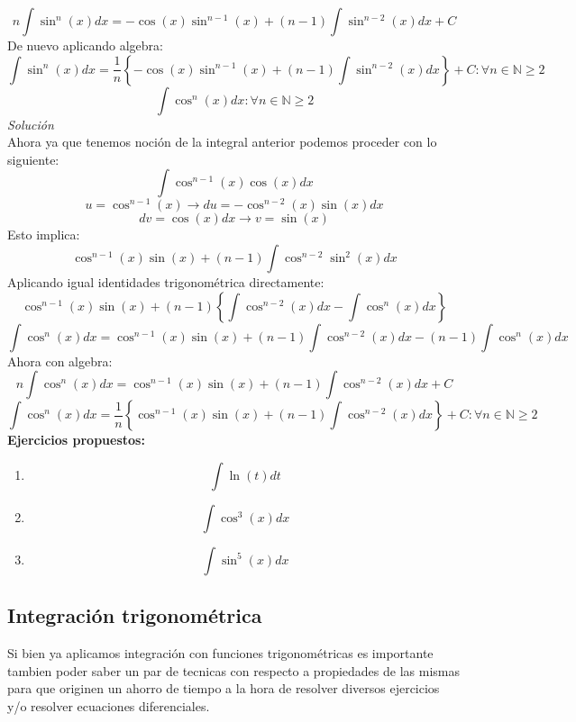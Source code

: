 \documentclass[10pt,executivepaper]{article}
\begin{document}
\[n\int\sin^{n}(x)dx=-\cos(x)\sin^{n-1}(x) + (n-1)\int \sin^{n-2}(x)dx + C\]
De nuevo aplicando algebra:
\[\int\sin^{n}(x)dx=\frac{1}{n}\left\{-\cos(x)\sin^{n-1}(x) + (n-1)\int \sin^{n-2}(x)dx\right\} + C \colon \forall n\in\mathbb{N}\geq 2\]
\vspace{1cm}
\[\int \cos^{n}(x)dx \colon \forall n\in\mathbb{N}\geq 2\]
\textit{Solución}\\
Ahora ya que tenemos noción de la integral anterior podemos proceder con lo siguiente:
\[\int\cos^{n-1}(x)\cos(x)dx\]
\[u=\cos^{n-1}(x)\rightarrow du=-\cos^{n-2}(x)\sin(x)dx\]
\[dv=\cos(x)dx \rightarrow v=\sin(x)\]
Esto implica:
\[\cos^{n-1}(x)\sin(x)+(n-1)\int\cos^{n-2}\sin^{2}(x)dx\]
Aplicando igual identidades trigonométrica directamente:
\[\cos^{n-1}(x)\sin(x)+(n-1)\left\{\int\cos^{n-2}(x)dx - \int\cos^{n}(x)dx\right\}\]
\[\int\cos^{n}(x)dx =\cos^{n-1}(x)\sin(x)+(n-1)\int\cos^{n-2}(x)dx-(n-1)\int\cos^{n}(x)dx\ \]
Ahora con algebra:
\[n\int\cos^{n}(x)dx =\cos^{n-1}(x)\sin(x)+(n-1)\int\cos^{n-2}(x)dx+C\]
\[\int\cos^{n}(x)dx =\frac{1}{n}\left\{\cos^{n-1}(x)\sin(x)+(n-1)\int\cos^{n-2}(x)dx\right\}+C \colon \forall n\in\mathbb{N}\geq 2\]
\textbf{Ejercicios propuestos:}
\begin{enumerate}
  \item \[\int\ln(t)dt\]
  \item \[\int \cos^{3}(x)dx\]
  \item \[\int \sin^{5}(x)dx\]
\end{enumerate}
\clearpage

\subsection{Integración trigonométrica}
Si bien ya aplicamos integración con funciones trigonométricas es importante tambien poder saber un par de tecnicas con respecto a propiedades de las mismas para que originen un ahorro de tiempo a la hora de resolver diversos ejercicios y/o resolver ecuaciones diferenciales.\\
\end{document}
